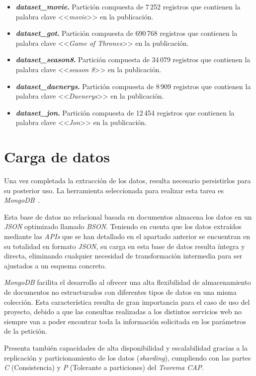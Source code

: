 \begin{itemize}
    \item \textbf{\textit{dataset\_movie}.} Partición compuesta de 7\,252 registros que contienen la palabra clave <<\textit{movie}>> en la publicación.
    \item \textbf{\textit{dataset\_got}.} Partición compuesta de 690\,768 registros que contienen la palabra clave <<\textit{Game of Thrones}>> en la publicación.
    \item \textbf{\textit{dataset\_season8}.} Partición compuesta de 34\,079 registros que contienen la palabra clave <<\textit{season 8}>> en la publicación.
    \item \textbf{\textit{dataset\_daenerys}.} Partición compuesta de 8\,909 registros que contienen la palabra clave <<\textit{Daenerys}>> en la publicación.
    \item \textbf{\textit{dataset\_jon}.} Partición compuesta de 12\,454 registros que contienen la palabra clave <<\textit{Jon}>> en la publicación.
\end{itemize}

\section{Carga de datos}

Una vez completada la extracción de los datos, resulta necesario persistirlos para su posterior uso. La herramienta seleccionada para realizar esta tarea es \textit{MongoDB}~\cite{mongodbArchitecture}.

Esta base de datos no relacional basada en documentos almacena los datos en un \textit{JSON} optimizado llamado \textit{BSON}. Teniendo en cuenta que los datos extraídos mediante las \textit{APIs} que se han detallado en el apartado anterior se encuentran en su totalidad en formato \textit{JSON}, su carga en esta base de datos resulta íntegra y directa, eliminando cualquier necesidad de transformación intermedia para ser ajustados a un esquema concreto.

\textit{MongoDB} facilita el desarrollo al ofrecer una alta flexibilidad de almacenamiento de documentos no estructurados con diferentes tipos de datos en una misma colección. Esta característica resulta de gran importancia para el caso de uso del proyecto, debido a que las consultas realizadas a los distintos servicios web no siempre van a poder encontrar toda la información solicitada en los parámetros de la petición.

Presenta también capacidades de alta disponibilidad y escalabilidad gracias a la replicación y particionamiento de los datos (\textit{sharding}), cumpliendo con las partes \textit{C} (Consistencia) y \textit{P} (Tolerante a particiones) del \textit{Teorema CAP}.

